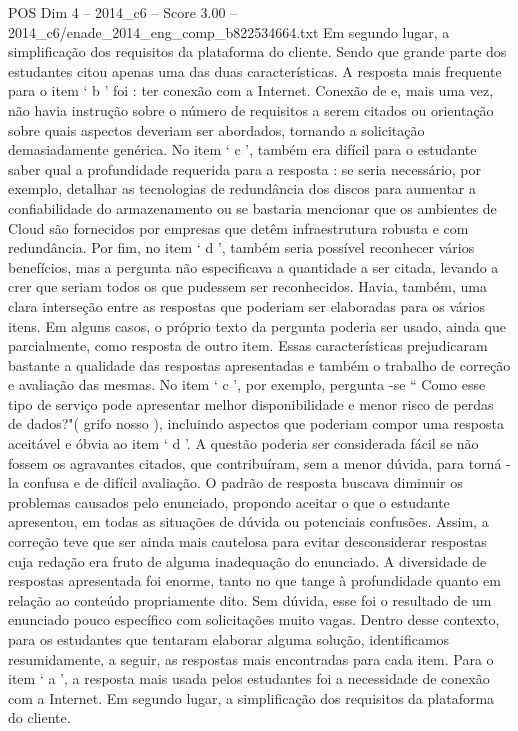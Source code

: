 \begin{textsample}{POS Dim 4 – 2014\_c6 – Score 3.00 – 2014\_c6/enade\_2014\_eng\_comp\_b822534664.txt}
Em segundo lugar, a simplificação dos requisitos da plataforma do cliente.
Sendo que grande parte dos estudantes citou apenas uma das duas características.
A resposta mais frequente para o item ‘ b ’ foi : ter conexão com a Internet.
Conexão de e, mais uma vez, não havia instrução sobre o número de requisitos a serem citados ou orientação sobre quais aspectos deveriam ser abordados, tornando a solicitação demasiadamente genérica.
No item ‘ c ’, também era difícil para o estudante saber qual a profundidade requerida para a resposta : se seria necessário, por exemplo, detalhar as tecnologias de redundância dos discos para aumentar a confiabilidade do armazenamento ou se bastaria mencionar que os ambientes de Cloud são fornecidos por empresas que detêm infraestrutura robusta e com redundância.
Por fim, no item ‘ d ’, também seria possível reconhecer vários benefícios, mas a pergunta não especificava a quantidade a ser citada, levando a crer que seriam todos os que pudessem ser reconhecidos.
Havia, também, uma clara interseção entre as respostas que poderiam ser elaboradas para os vários itens.
Em alguns casos, o próprio texto da pergunta poderia ser usado, ainda que parcialmente, como resposta de outro item.
Essas características prejudicaram bastante a qualidade das respostas apresentadas e também o trabalho de correção e avaliação das mesmas.
No item ‘ c ’, por exemplo, pergunta -se “ Como esse tipo de serviço pode apresentar melhor disponibilidade e menor risco de perdas de dados?"( grifo nosso ), incluindo aspectos que poderiam compor uma resposta aceitável e óbvia ao item ‘ d ’.
A questão poderia ser considerada fácil se não fossem os agravantes citados, que contribuíram, sem a menor dúvida, para torná -la confusa e de difícil avaliação.
O padrão de resposta buscava diminuir os problemas causados pelo enunciado, propondo aceitar o que o estudante apresentou, em todas as situações de dúvida ou potenciais confusões.
Assim, a correção teve que ser ainda mais cautelosa para evitar desconsiderar respostas cuja redação era fruto de alguma inadequação do enunciado.
A diversidade de respostas apresentada foi enorme, tanto no que tange à profundidade quanto em relação ao conteúdo propriamente dito.
Sem dúvida, esse foi o resultado de um enunciado pouco específico com solicitações muito vagas.
Dentro desse contexto, para os estudantes que tentaram elaborar alguma solução, identificamos resumidamente, a seguir, as respostas mais encontradas para cada item.
Para o item ‘ a ’, a resposta mais usada pelos estudantes foi a necessidade de conexão com a Internet.
Em segundo lugar, a simplificação dos requisitos da plataforma do cliente.

\end{textsample}
